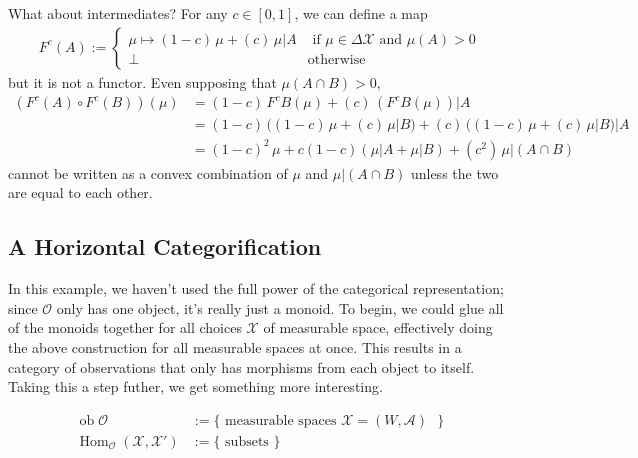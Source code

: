 \documentclass{article}
\DeclareMathOperator{\ob}{\mathrm{ob}}
\DeclareMathOperator{\Hom}{\mathrm{Hom}}
\newcommand\X{\mathcal{X}}
\newcommand\A{\mathcal{A}}
\begin{document}
    What about intermediates?  For any $c \in [0,1]$, we can define a map
    \begin{align*}
        F^c(A
        ) := 
            \begin{cases}
                \mu \mapsto  (1-c)\, \mu + (c)\, \mu| A & \text{ if } \mu  \in \Delta\X \text{ and }\mu(A) > 0 \\
                \bot &\text{otherwise}                
        \end{cases}
    \end{align*}
    but it is not a functor. Even supposing that $\mu(A \cap B) > 0$, 
    \begin{align*}
        (F^c(A) \circ F^c(B))(\mu) 
            &= (1-c)\, F^c B(\mu) + (c)\,(F^c B(\mu))|A \\
            &= (1-c)\, \Big( (1-c)\, \mu + (c)\, \mu| B \Big) + (c)\, 
                \Big((1-c)\, \mu + (c)\, \mu| B\Big)|A \\
            &= (1-c)^2\,\mu + c(1-c) (\mu|A + \mu|B) + (c^2)\, \mu|(A \cap B)
    \end{align*}
    cannot be written as a convex combination of $\mu$ and $\mu|(A\cap B)$ unless the two are equal to each other. 
    
    
    \subsection*{A Horizontal Categorification}
    In this example, we haven't used the full power of the categorical representation; since $\mathcal O$ only has one object, it's really just a monoid. 
    To begin, we could glue all of the monoids together for all choices $\mathcal X$ of measurable space, effectively doing the above construction for all measurable spaces at once. This results in a category of observations that only has morphisms from each object to itself.     
    Taking this a step futher, we get something more interesting.
    
    \begin{align*}
        \ob \mathcal O &:= 
            \{ \text{ measurable spaces $\mathcal X = (W, \mathcal A)$ } \}\\
        \Hom_{\mathcal O}(\mathcal X, \mathcal X') &:= 
            \Big\{ \text{ subsets } \Big\}
    \end{align*}
\end{document}
